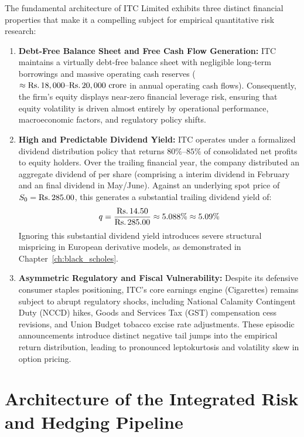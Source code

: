 The fundamental architecture of ITC Limited exhibits three distinct financial properties that make it a compelling subject for empirical quantitative risk research:
\begin{enumerate}
    \item \textbf{Debt-Free Balance Sheet and Free Cash Flow Generation:} ITC maintains a virtually debt-free balance sheet with negligible long-term borrowings and massive operating cash reserves ($\approx \text{\text{Rs.}\,}18,000\text{--}\text{\text{Rs.}\,}20,000\text{ crore}$ in annual operating cash flows). Consequently, the firm's equity displays near-zero financial leverage risk, ensuring that equity volatility is driven almost entirely by operational performance, macroeconomic factors, and regulatory policy shifts.
    \item \textbf{High and Predictable Dividend Yield:} ITC operates under a formalized dividend distribution policy that returns $80\%\text{--}85\%$ of consolidated net profits to equity holders. Over the trailing financial year, the company distributed an aggregate dividend of  per share (comprising a  interim dividend in February and an  final dividend in May/June). Against an underlying spot price of $S_0 = \text{\text{Rs.}\,}285.00$, this generates a substantial trailing dividend yield of:
    \begin{equation}
    q = \frac{\text{\text{Rs.}\,}14.50}{\text{\text{Rs.}\,}285.00} \approx 5.088\% \approx 5.09\%
    \end{equation}
    Ignoring this substantial dividend yield introduces severe structural mispricing in European derivative models, as demonstrated in Chapter~\ref{ch:black_scholes}.
    \item \textbf{Asymmetric Regulatory and Fiscal Vulnerability:} Despite its defensive consumer staples positioning, ITC's core earnings engine (Cigarettes) remains subject to abrupt regulatory shocks, including National Calamity Contingent Duty (NCCD) hikes, Goods and Services Tax (GST) compensation cess revisions, and Union Budget tobacco excise rate adjustments. These episodic announcements introduce distinct negative tail jumps into the empirical return distribution, leading to pronounced leptokurtosis and volatility skew in option pricing.
\end{enumerate}

\section{Architecture of the Integrated Risk and Hedging Pipeline}
\label{sec:architecture_pipeline}


